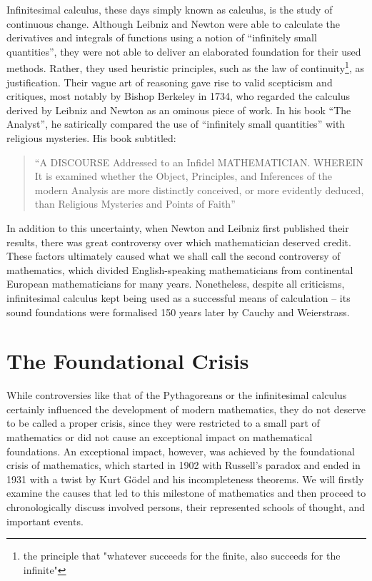 \documentclass{article}
\begin{document}
Infinitesimal calculus, these days simply known as calculus, is the study of continuous change. Although Leibniz and Newton were able to calculate the derivatives and integrals of functions using a notion of ``infinitely small quantities'', they were not able to deliver an elaborated foundation for their used methods. Rather, they used heuristic principles, such as the law of continuity\footnote{the principle that "whatever succeeds for the finite, also succeeds for the infinite"}, as justification. Their vague art of reasoning gave rise to valid scepticism and critiques, most notably by Bishop Berkeley in 1734, who regarded the calculus derived by Leibniz and Newton as an ominous piece of work. In his book ``The Analyst'', he satirically compared the use of ``infinitely small quantities'' with religious mysteries. His book subtitled:
\begin{quote}
``A DISCOURSE Addressed to an Infidel MATHEMATICIAN\@. WHEREIN It is examined whether the Object, Principles, and Inferences of the modern Analysis are more distinctly conceived, or more evidently deduced, than Religious Mysteries and Points of Faith''
\end{quote}
In addition to this uncertainty, when Newton and Leibniz first published their results, there was great controversy over which mathematician deserved credit. These factors ultimately caused what we shall call the second controversy of mathematics, which divided English-speaking mathematicians from continental European mathematicians for many years. None\-theless, despite all criticisms, infinitesimal calculus kept being used as a successful means of calculation -- its sound foundations were formalised 150 years later by Cauchy and Weierstrass.

\section{The Foundational Crisis}
While controversies like that of the Pythagoreans or the infinitesimal calculus certainly influenced the development of modern mathematics, they do not deserve to be called a proper crisis, since they were restricted to a small part of mathematics or did not cause an exceptional impact on mathematical foundations. An exceptional impact, however, was achieved by the foundational crisis of mathematics, which started in 1902 with Russell's paradox and ended in 1931 with a twist by Kurt Gödel and his incompleteness theorems.
We will firstly examine the causes that led to this milestone of mathematics and then proceed to chronologically discuss involved persons, their represented schools of thought, and important events.
\end{document}
